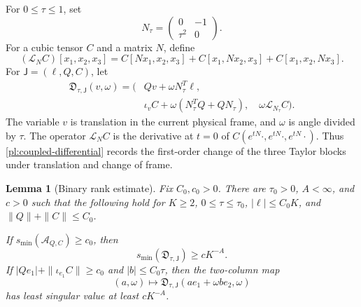 \documentclass[11pt]{amsart}
\newtheorem{lemma}[theorem]{Lemma}
\theoremstyle{definition}
\theoremstyle{remark}
\numberwithin{equation}{section}
\begin{document}
For $0\le\tau\le1$, set
\begin{equation}\label{pl:N-tau}
N_\tau=\begin{pmatrix}0&-1\\ \tau^2&0\end{pmatrix}.
\end{equation}
For a cubic tensor $C$ and a matrix $N$, define
\[
(\mathcal L_NC)[x_1,x_2,x_3]
=C[Nx_1,x_2,x_3]+C[x_1,Nx_2,x_3]+C[x_1,x_2,Nx_3].
\]
For $\mathsf J=(\ell,Q,C)$, let
\begin{equation}\label{pl:coupled-differential}
\begin{split}
\mathfrak D_{\tau,\mathsf J}(v,\omega)
=\bigl(&Qv+\omega N_\tau^T\ell,\\
&\iota_vC+\omega(N_\tau^TQ+QN_\tau),\quad
\omega\mathcal L_{N_\tau}C\bigr).
\end{split}
\end{equation}
The variable $v$ is translation in the current physical frame, and $\omega$ is angle divided by $\tau$. The operator $\mathcal L_NC$ is the derivative at $t=0$ of $C(e^{tN}\cdot,e^{tN}\cdot,e^{tN}\cdot)$. Thus \eqref{pl:coupled-differential} records the first-order change of the three Taylor blocks under translation and change of frame.

\begin{lemma}[Binary rank estimate]\label{pl:binary-rank}
Fix $C_0,c_0>0$. There are $\tau_0>0$, $A<\infty$, and $c>0$ such that the following hold for $K\ge2$, $0\le\tau\le\tau_0$, $|\ell|\le C_0K$, and $\|Q\|+\|C\|\le C_0$.

If $s_{\min}(\mathcal A_{Q,C})\ge c_0$, then
\begin{equation}\label{pl:full-differential-bound}
s_{\min}(\mathfrak D_{\tau,\mathsf J})\ge cK^{-A}.
\end{equation}
If $|Qe_1|+\|\iota_{e_1}C\|\ge c_0$ and $|b|\le C_0\tau$, then the two-column map
\begin{equation}\label{pl:capped-differential}
(a,\omega)\longmapsto
\mathfrak D_{\tau,\mathsf J}(ae_1+\omega b e_2,\omega)
\end{equation}
has least singular value at least $cK^{-A}$.
\end{lemma}
\end{document}
